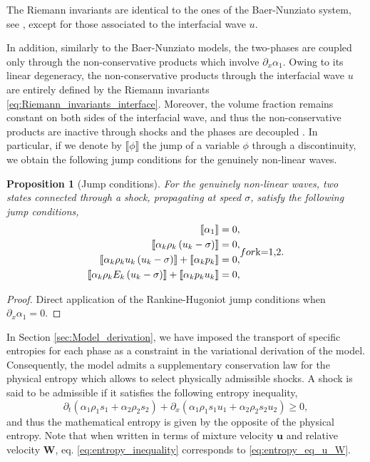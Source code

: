 \documentclass{myclass}
\newtheorem{proposition}{\bf Proposition}[section]
\newcommand{\vel}{\bm{u}}
\newcommand{\pth}[1]  {\left( #1 \right)}
\newcommand{\jump}[1]{\llbracket #1\rrbracket}
\begin{document}
The Riemann invariants are identical to the ones of the Baer-Nunziato system, see \cite{gallouet:2004}, except for those associated to the interfacial wave $u$.

In addition, similarly to the Baer-Nunziato models, the two-phases are coupled only through the non-conservative products which involve $\partial_x\alpha_1$. Owing to its linear degeneracy, the non-conservative products through the interfacial wave $u$ are entirely defined by the Riemann invariants \eqref{eq:Riemann_invariants_interface}. Moreover, the volume fraction remains constant on both sides of the interfacial wave, and thus the non-conservative products are inactive through shocks and the phases are decoupled \cite{gallouet:2004}. In particular, if we denote by $\jump{\phi}$ the jump of a variable $\phi$ through a discontinuity, we obtain the following jump conditions for the genuinely non-linear waves.

\begin{proposition}[Jump conditions]
For the genuinely non-linear waves, two states connected through a shock, propagating at speed $\sigma$, satisfy the following jump conditions,
\begin{subequations}
\begin{align}
\jump{\alpha_1} &= 0,\\
\jump{\alpha_k \rho_k\pth{u_k-\sigma}} &=0,\\
\jump{\alpha_k \rho_k u_k\pth{u_k-\sigma}} + \jump{\alpha_k p_k} &=0,\\
\jump{\alpha_k \rho_k E_k\pth{u_k-\sigma}} + \jump{\alpha_k p_k u_k} &=0,
\end{align}
for $k=1,2$.
\end{subequations}
\end{proposition}
\begin{proof}
Direct application of the Rankine-Hugoniot jump conditions when $\partial_x\alpha_1 =0$.
\end{proof}

In Section \ref{sec:Model_derivation}, we have imposed the transport of specific entropies for each phase as a constraint in the variational derivation of the model. Consequently, the model admits a supplementary conservation law for the physical entropy which allows to select physically admissible shocks.
A shock is said to be admissible if it satisfies the following entropy inequality, 
\begin{equation}\label{eq:entropy_inequality}
\partial_t\pth{\alpha_1\rho_1 s_1 + \alpha_2 \rho_2 s_2} + \partial_x \pth{\alpha_1\rho_1 s_1 u_1 + \alpha_2 \rho_2 s_2 u_2} \geq 0,
\end{equation}
and thus the mathematical entropy is given by the opposite of the physical entropy. Note that when written in terms of mixture velocity $\vel$ and relative velocity $\bm{W}$, eq. \eqref{eq:entropy_inequality} corresponds to \eqref{eq:entropy_eq_u_W}.
\end{document}
